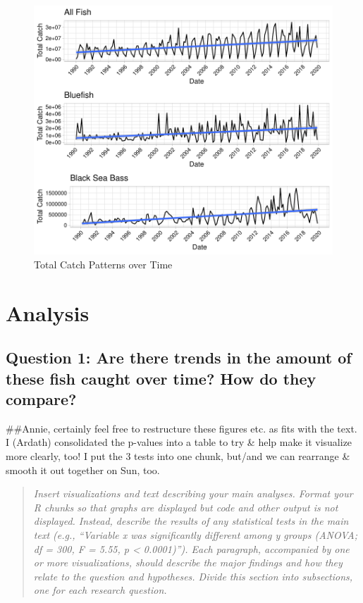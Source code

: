 \documentclass[
  12pt,
]{article}
\begin{document}
\begin{figure}[H]

\hfill{}\includegraphics{Report_FishTrends_files/figure-latex/ggplot-1} 

\caption{Total Catch Patterns over Time}\label{fig:ggplot}
\end{figure}

\newpage

\hypertarget{analysis}{%
\section{Analysis}\label{analysis}}

\hypertarget{question-1-are-there-trends-in-the-amount-of-these-fish-caught-over-time-how-do-they-compare}{%
\subsection{Question 1: Are there trends in the amount of these fish
caught over time? How do they
compare?}\label{question-1-are-there-trends-in-the-amount-of-these-fish-caught-over-time-how-do-they-compare}}

\#\#Annie, certainly feel free to restructure these figures etc. as fits
with the text. I (Ardath) consolidated the p-values into a table to try
\& help make it visualize more clearly, too! I put the 3 tests into one
chunk, but/and we can rearrange \& smooth it out together on Sun, too.

\begin{quote}
\emph{Insert visualizations and text describing your main analyses.
Format your R chunks so that graphs are displayed but code and other
output is not displayed. Instead, describe the results of any
statistical tests in the main text (e.g., ``Variable x was significantly
different among y groups (ANOVA; df = 300, F = 5.55, p \textless{}
0.0001)''). Each paragraph, accompanied by one or more visualizations,
should describe the major findings and how they relate to the question
and hypotheses. Divide this section into subsections, one for each
research question.}
\end{quote}
\end{document}
